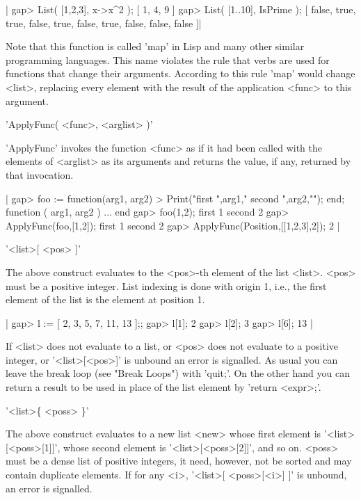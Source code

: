 |    gap> List( [1,2,3], x->x^2 );
    [ 1, 4, 9 ]
    gap> List( [1..10], IsPrime );
    [ false, true, true, false, true, false, true, false, false, false ]|

Note that this function  is called 'map' in  Lisp and many other  similar
programming languages.  This name violates the {\GAP} rule that verbs are
used for functions  that change their arguments.   According to this rule
'map' would change <list>, replacing every element with the result of the
application <func> to this argument.

%

'ApplyFunc( <func>, <arglist> )'

'ApplyFunc' invokes the function <func> as if it had been called with the
elements of <arglist> as its arguments and returns the value, if any,
returned by that invocation. 

|    gap> foo := function(arg1, arg2) 
    > Print("first ",arg1," second ",arg2,"\n"); end;
    function ( arg1, arg2 ) ... end
    gap> foo(1,2);
    first 1 second 2
    gap> ApplyFunc(foo,[1,2]);
    first 1 second 2
    gap> ApplyFunc(Position,[[1,2,3],2]);
    2 |




%

'<list>[ <pos> ]'

The above construct evaluates to the <pos>-th element of the list <list>.
<pos>  must be a positive integer.  List indexing is done  with origin 1,
i.e., the first element of the list is the element at position 1.

|    gap> l := [ 2, 3, 5, 7, 11, 13 ];;
    gap> l[1];
    2
    gap> l[2];
    3
    gap> l[6];
    13 |

If <list> does not evaluate to a  list, or <pos>  does not evaluate to  a
positive integer, or '<list>[<pos>]'  is  unbound an  error is signalled.
As usual you  can leave the break  loop (see "Break Loops") with 'quit;'.
On the other hand you can return a result to be used in place of the list
element by 'return <expr>;'.

'<list>\{ <poss> \}'

The above  construct evaluates to a new list <new> whose first element is
'<list>[<poss>[1]]', whose  second element is '<list>[<poss>[2]]', and so
on.  <poss>  must be a dense list of positive integers, it need, however,
not be  sorted  and  may  contain  duplicate  elements.  If for  any <i>,
'<list>[ <poss>[<i>] ]' is unbound, an error is signalled.

